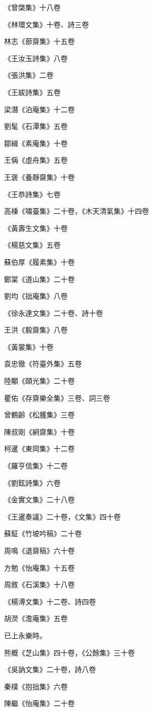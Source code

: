 《曾棨集》十八卷

《林環文集》十卷、詩三卷

林志《蔀齋集》十五卷

《王汝玉詩集》八卷

《張洪集》二卷

《王紱詩集》五卷

梁潛《泊庵集》十二卷

劉髦《石潭集》五卷

鄒緝《素庵集》十卷

王偁《虛舟集》五卷

王褒《養靜齋集》十卷

《王恭詩集》七卷

高棅《嘯臺集》二十卷，《木天清氣集》十四卷

《黃壽生文集》十卷

《楊慈文集》五卷

蘇伯厚《履素集》十卷

鄭棠《道山集》二十卷

劉均《拙庵集》八卷

《徐永達文集》二十卷、詩十卷

王洪《毅齋集》八卷

《黃裳集》十卷

袁忠徹《符臺外集》五卷

陸顒《頤光集》二十卷

瞿佑《存齋樂全集》三卷、詞三卷

曾鶴齡《松臒集》三卷

陳叔剛《絅齋集》十卷

柯暹《東岡集》十二卷

《羅亨信集》十二卷

《劉鉉詩集》六卷

《金實文集》二十八卷

《王暹奏議》二十卷，《文集》四十卷

蘇鉦《竹坡吟稿》二十卷

周鳴《退齋稿》六十卷

方勉《怡庵集》十五卷

周敘《石溪集》十八卷

《楊溥文集》十二卷、詩四卷

胡濙《澹庵集》五卷

已上永樂時。

熊概《芝山集》四十卷，《公餘集》三十卷

《吳訥文集》二十卷，詩八卷

秦樸《抱拙集》六卷

陳繼《怡庵集》二十卷

